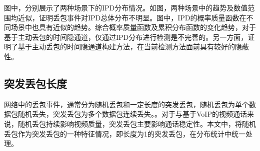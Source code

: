 
图中，分别展示了两种场景下的IPD分布情况。如图，两种场景中的趋势及数值范围均近似，证明丢包事件对IPD总体分布不明显。图中，IPD的概率质量函数在不同场景中也具有近似的趋势。综合概率质量函数及累积分布函数的变化趋势，对于基于主动丢包的时间隐通道，仅通过IPD分布进行检测是不完善的。另一方面，证明了基于主动丢包的时间隐通道构建方法，在当前检测方法面前具有较好的隐蔽性。

\subsection{突发丢包长度}
\label{chap:analyze:results:burst}

网络中的丢包事件，通常分为随机丢包和一定长度的突发丢包，随机丢包为单个数据包随机丢失，突发丢包为多个数据包连续丢失。。对于与基于VoIP的视频通话来说，随机丢包持续影响视频质量，突发丢包主要影响通话稳定性。本文中，将随机丢包作为突发丢包的一种特征情况，即长度为1的突发丢包，在分布统计中统一处理。

